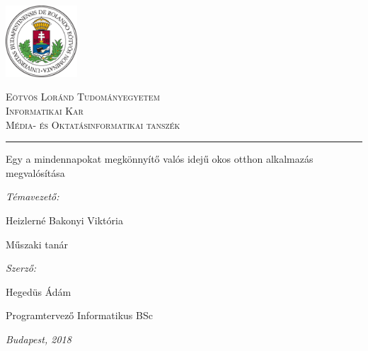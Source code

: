 
\begin{titlepage}

\noindent
\parbox[m]{0.2\textwidth}{
 \includegraphics[width=0.2\textwidth]{images/elte_cimer_szines.eps} %
}
\hfill
\parbox[m]{0.7\textwidth}{
\begin{center}
\begin{large}
\textsc{
Eötvös Loránd Tudományegyetem\\
\vspace{0.5pc}
Informatikai Kar\\
\vspace{0.5pc}
Média- és Oktatásinformatikai tanszék\\
}
\end{large}
\end{center}
}

\vspace{1pc}
\hrule

\vfill

\begin{center}
{\LARGE Egy a mindennapokat megkönnyítő valós idejű okos otthon alkalmazás megvalósítása}
\end{center}

\vfill

\noindent
\hspace*{0.05\textwidth}
\parbox{0.45\textwidth}{
{\it Témavezető:}
\bigskip

{\Large Heizlerné Bakonyi Viktória }
\smallskip

Műszaki tanár
}
\hfill
\parbox{0.45\textwidth}{
{\it Szerző:}
\bigskip

{\Large Hegedüs Ádám}
\smallskip

Programtervező Informatikus BSc
}


\vfill

\begin{center}
{\large {\it Budapest, 2018}}
\end{center}

\end{titlepage}

